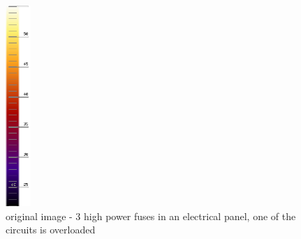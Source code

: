 \documentclass[12pt,twoside,a4paper,titlepage]{report}
\begin{document}
\begin{figure}[ht]
 \includegraphics[width=9.5mm, keepaspectratio=true width=10cm]{img/FLIR_P60_orig_scale}
 \caption{original image - 3 high power fuses in an electrical panel, one of the circuits is overloaded}
 \label{fig:tools-export-orig-image}
\end{figure}
\end{document}
